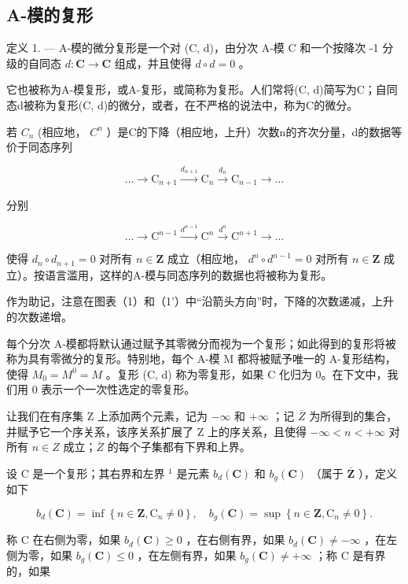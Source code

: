 \subsection{A-模的复形}

定义 1. --- A-模的微分复形是一个对 (C, d)，由分次 A-模 C 和一个按降次 -1 分级的自同态 \(d: \mathbf{C} \to \mathbf{C}\) 组成，并且使得 \(d \circ d = 0\) 。

它也被称为A-模复形，或A-复形，或简称为复形。人们常将(C, d)简写为C；自同态d被称为复形(C, d)的微分，或者，在不严格的说法中，称为C的微分。

若 \(C_{n}\) (相应地， \(C^{n}\) ）是C的下降（相应地，上升）次数n的齐次分量，d的数据等价于同态序列

\[
\dots \longrightarrow \mathrm{C} _ {n + 1} \xrightarrow {d _ {n + 1}} \mathrm{C} _ {n} \xrightarrow {d _ {n}} \mathrm{C} _ {n - 1} \longrightarrow \dots\tag{1}
\]

分别

\[
\dots \longrightarrow \mathrm{C} ^ {n - 1} \xrightarrow {d ^ {n - 1}} \mathrm{C} ^ {n} \xrightarrow {d ^ {n}} \mathrm{C} ^ {n + 1} \longrightarrow \dots\tag{1'}
\]

使得 \(d_n \circ d_{n+1} = 0\) 对所有 \(n \in \mathbf{Z}\) 成立（相应地， \(d^n \circ d^{n-1} = 0\) 对所有 \(n \in \mathbf{Z}\) 成立）。按语言滥用，这样的A-模与同态序列的数据也将被称为复形。

作为助记，注意在图表（1）和（1'）中“沿箭头方向”时，下降的次数递减，上升的次数递增。

每个分次 A-模都将默认通过赋予其零微分而视为一个复形；如此得到的复形将被称为具有零微分的复形。特别地，每个 A-模 M 都将被赋予唯一的 A-复形结构，使得 \(M_{0} = M^{0} = M\) 。复形 (C, d) 称为零复形，如果 C 化归为 0。在下文中，我们用 0 表示一个一次性选定的零复形。

让我们在有序集 Z 上添加两个元素，记为 \(-\infty\) 和 \(+\infty\) ；记 \(\overline{Z}\) 为所得到的集合，并赋予它一个序关系，该序关系扩展了 Z 上的序关系，且使得 \(-\infty < n < +\infty\) 对所有 \(n \in Z\) 成立；\(\overline{Z}\) 的每个子集都有下界和上界。

设 C 是一个复形；其右界和左界 \(^{1}\) 是元素 \(b_{d}(\mathbf{C})\) 和 \(b_{g}(\mathbf{C})\) （属于 \(\overline{\mathbf{Z}}\) ），定义如下

\[
b _ {d} (\mathbf {C}) = \inf \left\{n \in \mathbf {Z}, \mathrm{C} _ {n} \neq 0 \right\}, \quad b _ {g} (\mathbf {C}) = \sup \left\{n \in \mathbf {Z}, \mathrm{C} _ {n} \neq 0 \right\}.
\]

称 C 在右侧为零，如果 \(b_{d}(\mathbf{C}) \geqslant 0\) ，在右侧有界，如果 \(b_{d}(\mathbf{C}) \neq -\infty\) ，在左侧为零，如果 \(b_{g}(\mathbf{C}) \leqslant 0\) ，在左侧有界，如果 \(b_{g}(\mathbf{C}) \neq +\infty\) ；称 C 是有界的，如果

